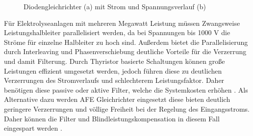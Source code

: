 		\begin{figure}[H]
			\centering
			\qquad
			\caption{Diodengleichrichter (a) mit Strom und Spannungsverlauf (b)}
			\label{fig:B6DiodRect}
		\end{figure}
		
		Für Elektrolyseanlagen mit mehreren Megawatt Leistung müssen Zwangsweise Leistungshalbleiter parallelisiert werden, da bei Spannungen bis 1000 V die Ströme für einzelne Halbleiter zu hoch sind. Außerdem bietet die Parallelisierung durch Interleaving und Phasenverschiebung deutliche Vorteile für die Verzerrung und damit Filterung. Durch Thyristor basierte Schaltungen können große Leistungen effizient umgesetzt werden, jedoch führen diese zu deutlichen Verzerrungen des Stromverlaufs und schlechterem Leistungsfaktor. Daher benötigen diese passive oder aktive Filter, welche die Systemkosten erhöhen \cite{HydrogenElectronicTopologies}.
		Als Alternative dazu werden \gls{AFE} Gleichrichter eingesetzt diese bieten deutlich geringere Verzerrungen und völlige Freiheit bei der Regelung des Eingangsstroms. Daher können die Filter und Blindleistungskompensation in diesem Fall eingespart werden \cite{HydrogenElectronicTopologies}.
		
